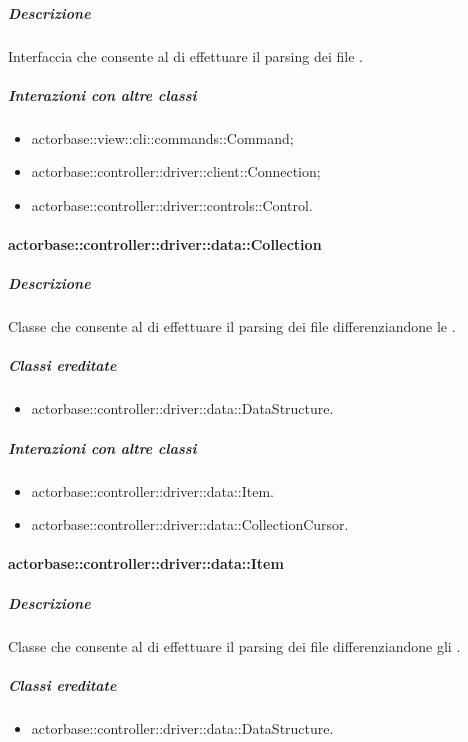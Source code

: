 \documentclass{scalatekids-article}
\begin{document}
\subparagraph{Descrizione}

Interfaccia che consente al  di effettuare il parsing dei file .

\subparagraph{Interazioni con altre classi}

\begin{itemize}
\item actorbase::view::cli::commands::Command;
\item actorbase::controller::driver::client::Connection;
\item actorbase::controller::driver::controls::Control.
\end{itemize}

\paragraph{actorbase::controller::driver::data::Collection}

\subparagraph{Descrizione}

Classe che consente al  di effettuare il parsing dei file  differenziandone le .

\subparagraph{Classi ereditate}

\begin{itemize}
\item actorbase::controller::driver::data::DataStructure.
\end{itemize}

\subparagraph{Interazioni con altre classi}

\begin{itemize}
\item actorbase::controller::driver::data::Item.
\item actorbase::controller::driver::data::CollectionCursor.
\end{itemize}

\paragraph{actorbase::controller::driver::data::Item}

\subparagraph{Descrizione}

Classe che consente al  di effettuare il parsing dei file  differenziandone gli .

\subparagraph{Classi ereditate}

\begin{itemize}
\item actorbase::controller::driver::data::DataStructure.
\end{itemize}
\end{document}
